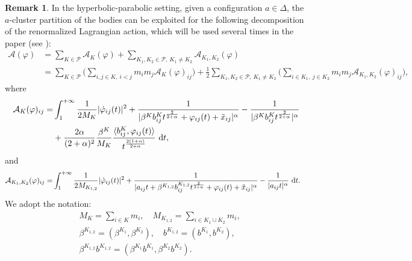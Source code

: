 \documentclass[a4paper,10pt]{amsart}
\newcommand{\ud}{\mathrm{d}}
\theoremstyle{plain}
\theoremstyle{definition}
\newtheorem{rem}[thm]{Remark}
\numberwithin{equation}{section}
\numberwithin{thm}{section}
\begin{document}
\begin{rem}

In the hyperbolic-parabolic setting, given a configuration $a\in\Delta$, the $a$-cluster partition of the bodies can be exploited for the following decomposition of the renormalized Lagrangian action, which will be used several times in the paper (see \cite{PolimeniTerracini}):
\begin{equation}\label{eq:decomposed_action}
\begin{split}
    \mathcal{A}(\varphi) & = \sum_{K\in\mathcal{P}} \mathcal{A}_{K}(\varphi) + \sum_{K_1,K_2\in\mathcal{P},\ K_1\neq K_2} \mathcal{A}_{K_1,K_2}(\varphi)\\
    &  = \sum_{K\in\mathcal{P}}\bigg(\sum_{i,j\in K,\ i<j} m_i m_j\mathcal{A}_{K}(\varphi)_{ij}\bigg) + \frac{1}{2}\sum_{K_1,K_2\in\mathcal{P},\ K_1\neq K_2}\bigg(\sum_{i\in K_1,\ j\in K_2} m_i m_j\mathcal{A}_{K_1,K_2}(\varphi)_{ij}\bigg),
\end{split}
\end{equation}
where
\[
\begin{split}
    \mathcal{A}_{K}(\varphi)_{ij} = & \int_{1}^{+\infty} \frac{1}{2M_{K}} |\dot{\varphi}_{ij}(t)|^2 + \frac{1}{|\beta^K b^K_{ij}t^{\frac{2}{2+\alpha}}+\varphi_{ij}(t)+\Tilde{x}_{ij}|^\alpha} - \frac{1}{|\beta^K b^K_{ij}t^{\frac{2}{2+\alpha}}|^\alpha} \\
    &+ \frac{2\alpha}{(2+\alpha)^2}\frac{\beta^K}{M_K} \frac{\langle b^K_{ij},\varphi_{ij}(t)\rangle}{t^{\frac{2(1+\alpha)}{2+\alpha}}}\ \ud t,
\end{split}
\]
and
\[
\begin{split}
    \mathcal{A}_{K_1,K_2}(\varphi)_{ij} = &\int_{1}^{+\infty}\frac{1}{2M_{K_{1,2}}} |\dot{\varphi}_{ij}(t)|^2+ \frac{1}{|a_{ij}t+\beta^{K_{1,2}} b^{K_{1,2}}_{ij}t^{\frac{2}{2+\alpha}}+\varphi_{ij}(t)+\Tilde{x}_{ij}|^\alpha} - \frac{1}{|a_{ij}t|^\alpha}\ \ud t.
\end{split}
\]
We adopt the notation:
\begin{displaymath}
    \begin{split}
        &M_K = \sum_{i\in K}m_i,\quad M_{K_{1,2}} = \sum_{i\in K_1\cup K_2}m_i,\\
        &\beta^{K_{1,2}}=(\beta^{K_1},\beta^{K_2}),\quad b^{K_{1,2}}=(b^{K_1},b^{K_2}),\\
        &\beta^{K_{1,2}}b^{K_{1,2}}=(\beta^{K_1}b^{K_1},\beta^{K_2}b^{K_2}).
    \end{split}
\end{displaymath}


\end{rem}
\end{document}
